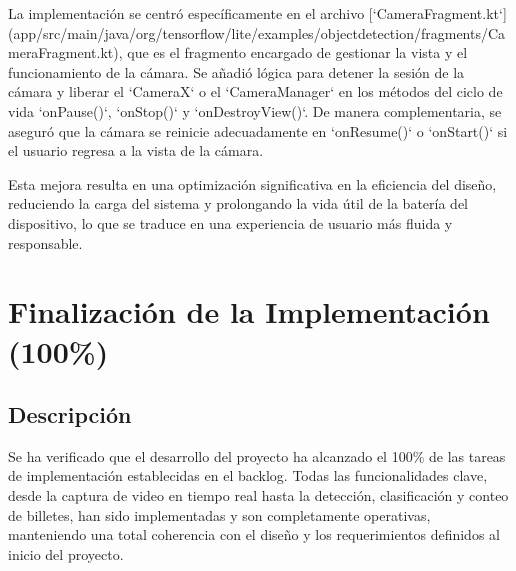 \documentclass[10pt,a4paper]{report}
\begin{document}
La implementación se centró específicamente en el archivo [`CameraFragment.kt`](app/src/main/java/org/tensorflow/lite/examples/objectdetection/fragments/CameraFragment.kt), que es el fragmento encargado de gestionar la vista y el funcionamiento de la cámara. Se añadió lógica para detener la sesión de la cámara y liberar el `CameraX` o el `CameraManager` en los métodos del ciclo de vida `onPause()`, `onStop()` y `onDestroyView()`. De manera complementaria, se aseguró que la cámara se reinicie adecuadamente en `onResume()` o `onStart()` si el usuario regresa a la vista de la cámara.

Esta mejora resulta en una optimización significativa en la eficiencia del diseño, reduciendo la carga del sistema y prolongando la vida útil de la batería del dispositivo, lo que se traduce en una experiencia de usuario más fluida y responsable.



\section{Finalización de la Implementación (100\%)}
\subsection{Descripción}
Se ha verificado que el desarrollo del proyecto ha alcanzado el 100\% de las tareas de implementación establecidas en el backlog. Todas las funcionalidades clave, desde la captura de video en tiempo real hasta la detección, clasificación y conteo de billetes, han sido implementadas y son completamente operativas, manteniendo una total coherencia con el diseño y los requerimientos definidos al inicio del proyecto.
\end{document}
